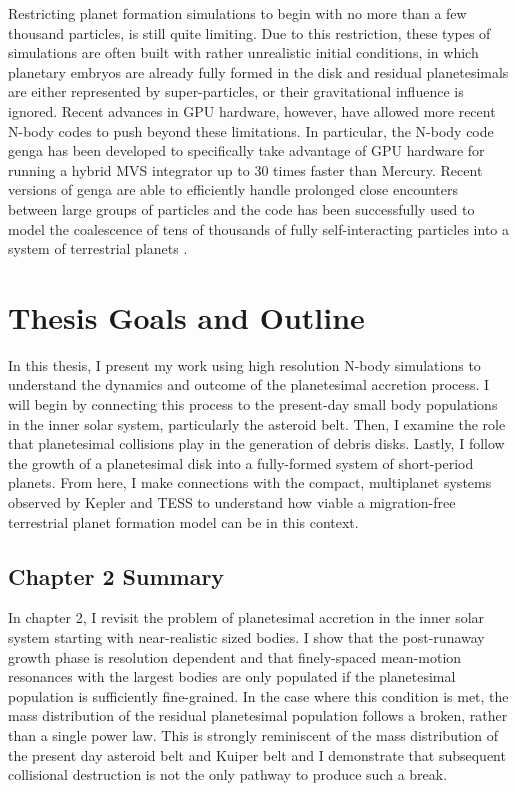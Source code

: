 Restricting planet formation simulations to begin with no more than a few thousand particles, is still quite limiting. Due to this restriction, these types of simulations are often built with rather unrealistic initial conditions, in which planetary embryos are already fully formed in the disk and residual planetesimals are either represented by super-particles, or their gravitational influence is ignored. Recent advances in GPU hardware, however, have allowed more recent N-body codes to push beyond these limitations. In particular, the N-body code {\sc genga} \cite{grimm14, grimm22} has been developed to specifically take advantage of GPU hardware for running a hybrid MVS integrator up to 30 times faster than {\sc Mercury}. Recent versions of {\sc genga} are able to efficiently handle prolonged close encounters between large groups of particles and the code has been successfully used to model the coalescence of tens of thousands of fully self-interacting particles into a system of terrestrial planets \cite{woo21}.

\section{Thesis Goals and Outline}

In this thesis, I present my work using high resolution N-body simulations to understand the dynamics and outcome of the planetesimal accretion process. I will begin by connecting this process to the present-day small body populations in the inner solar system, particularly the asteroid belt. Then, I examine the role that planetesimal collisions play in the generation of debris disks. Lastly, I follow the growth of a planetesimal disk into a fully-formed system of short-period planets. From here, I make connections with the compact, multiplanet systems observed by Kepler and TESS to understand how viable a migration-free terrestrial planet formation model can be in this context.

\subsection{Chapter 2 Summary}

In chapter 2, I revisit the problem of planetesimal accretion in the inner solar system starting with near-realistic sized bodies. I show that the post-runaway growth phase is resolution dependent and that finely-spaced mean-motion resonances with the largest bodies are only populated if the planetesimal population is sufficiently fine-grained. In the case where this condition is met, the mass distribution of the residual planetesimal population follows a broken, rather than a single power law. This is strongly reminiscent of the mass distribution of the present day asteroid belt and Kuiper belt and I demonstrate that subsequent collisional destruction is not the only pathway to produce such a break.

